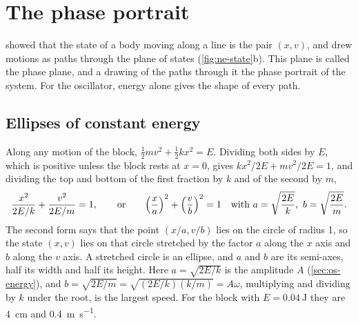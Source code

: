 \section{The phase portrait}
\label{sec:os-phase}

 showed that the state of a body moving along a
line is the pair $(x, v)$, and drew motions as paths through the plane of
states (\cref{fig:ne-state}b). This plane is called the phase plane, and a
drawing of the paths through it the phase portrait of the system. For the
oscillator, energy alone gives the shape of every path.

\subsection*{Ellipses of constant energy}

Along any motion of the block, $\frac12 mv^2 + \frac12 kx^2 = E$. Dividing
both sides by $E$, which is positive unless the block rests at $x = 0$,
gives $kx^2/2E + mv^2/2E = 1$, and dividing the top and bottom of the
first fraction by $k$ and of the second by $m$,
\begin{equation}
   \frac{x^2}{2E/k} + \frac{v^2}{2E/m} = 1 ,
   \qquad\text{or}\qquad
   \Bigl(\frac{x}{a}\Bigr)^2 + \Bigl(\frac{v}{b}\Bigr)^2 = 1
   \quad\text{with } a = \sqrt{\frac{2E}{k}},\ b = \sqrt{\frac{2E}{m}} .
   \label{eq:os-ellipse}
\end{equation}
The second form says that the point $(x/a, v/b)$ lies on the circle of
radius 1, so the state $(x, v)$ lies on that circle stretched by the
factor $a$ along the $x$ axis and $b$ along the $v$ axis. A stretched
circle is an ellipse, and $a$ and $b$ are its semi-axes, half its width
and half its height. Here $a = \sqrt{2E/k}$ is the amplitude $A$
(\cref{sec:os-energy}), and $b = \sqrt{2E/m} = \sqrt{(2E/k)(k/m)} =
A\omega$, multiplying and dividing by $k$ under the root, is the largest
speed. For the block with $E =
\SI{0.04}{\joule}$ they are \SI{4}{\centi\metre} and
\SI{0.4}{\metre\per\second}.

